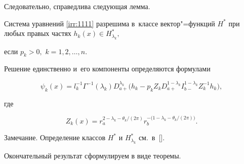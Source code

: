Следовательно, справедлива следующая лемма.



\smallskip

\begin{lemma}[3]Система уравнений \eqref{irr:1111} разрешима в~классе вектор"=функций $H^{*}$ при любых правых частях $h_{k}(x)\in H^{*}_{\lambda_{k}},$

если $p_{k}>0,$ $k=1, 2, \ldots, n.$ 

Решение единственно и~его компоненты определяются формулами

$$

\psi_{k}(x)=l^{-1}_{k}\Gamma^{-1}(\lambda_{k}) D^{\lambda_{k}}_{a+}

\bigl(h_{k}-p_{k}Z_{k}D^{1-\lambda_{k}}_{a+}I^{1-\lambda_{k}}_{b-}Z^{-1}_{k}h_{k}\bigr),$$

где

\begin{equation}\label{irr:13}

Z_{k}(x)=r_a^{2-\lambda_{k}-{\theta_k/(2\pi)}}r_b^{-(1-\lambda_{k}-{\theta_k/(2\pi))}}.

\end{equation}

\end{lemma}



\smallskip 



{\small \sc Замечание.} Определение классов $H^{*}$ и $H^{*}_{\lambda_{k}}$ см.~в~[].



\smallskip



Окончательный результат сформулируем в виде теоремы.



\smallskip



